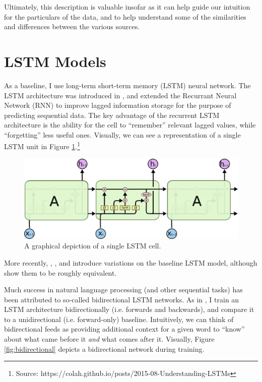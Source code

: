\documentclass{article}
\begin{document}
		Ultimately, this description is valuable insofar as it can help guide our intuition for the particulars of the data, and to help understand some of the similarities and differences between the various sources. 
	
	    	
	\section{LSTM Models}
	As a baseline, I use long-term short-term memory (LSTM) neural network. The LSTM architecture was introduced in \citet{hochreiter1997long}, and extended the Recurrant Neural Network (RNN) to improve lagged information storage for the purpose of predicting sequential data. The key advantage of the recurrent LSTM architecture is the ability for the cell to ``remember'' relevant lagged values, while ``forgetting'' less useful ones. Visually, we can see a representation of a single LSTM unit in Figure \ref{fig:lstm}.\footnote{Source: https://colah.github.io/posts/2015-08-Understanding-LSTMs}
	
	\begin{figure}[H]
		\includegraphics[width=\textwidth]{figures/images/lstm-math.png}
		\caption{A graphical depiction of a single LSTM cell.}
		\label{fig:lstm}
	\end{figure}

	More recently, \citet{gers2000recurrent}, \citet{chung2014empirical}, and \citet{yao2015depth} introduce variations on the baseline \citet{hochreiter1997long} LSTM model, although \citet{greff2016lstm} show them to be roughly equivalent. 
	
	Much success in natural language processing (and other sequential tasks) has been attributed to so-called bidirectional LSTM networks. As in \citet{wang2015unified}, I train an LSTM architecture bidirectionally (i.e. forwards and backwards), and compare it to a unidirectional (i.e. forward-only) baseline. Intuitively, we can think of bidirectional feeds as providing additional context for a given word to ``know'' about what came before it \textit{and} what comes after it. Visually, Figure \ref{fig:bidirectional} depicts a bidirectional network during training. 
	 
\end{document}
